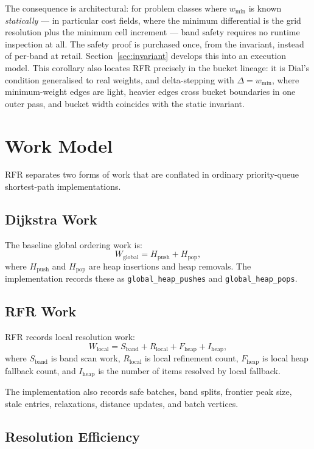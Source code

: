 \documentclass[11pt]{article}
\newcommand{\RFR}{\textsc{RFR}}
\begin{document}
The consequence is architectural: for problem classes where $w_{\min}$ is known \emph{statically} --- in particular cost fields, where the minimum differential is the grid resolution plus the minimum cell increment --- band safety requires no runtime inspection at all. The safety proof is purchased once, from the invariant, instead of per-band at retail. Section~\ref{sec:invariant} develops this into an execution model. This corollary also locates \RFR{} precisely in the bucket lineage: it is Dial's condition \cite{dial1969} generalised to real weights, and delta-stepping \cite{meyer2003} with $\Delta=w_{\min}$, where minimum-weight edges are light, heavier edges cross bucket boundaries in one outer pass, and bucket width coincides with the static invariant.

\section{Work Model}
\label{sec:work}

\RFR{} separates two forms of work that are conflated in ordinary priority-queue shortest-path implementations.

\subsection{Dijkstra Work}

The baseline global ordering work is:
\[
  W_{\text{global}} = H_{\text{push}} + H_{\text{pop}},
\]
where $H_{\text{push}}$ and $H_{\text{pop}}$ are heap insertions and heap removals. The implementation records these as \texttt{global\_heap\_pushes} and \texttt{global\_heap\_pops}.

\subsection{RFR Work}

\RFR{} records local resolution work:
\[
  W_{\text{local}} =
  S_{\text{band}} +
  R_{\text{local}} +
  F_{\text{heap}} +
  I_{\text{heap}},
\]
where $S_{\text{band}}$ is band scan work, $R_{\text{local}}$ is local refinement count, $F_{\text{heap}}$ is local heap fallback count, and $I_{\text{heap}}$ is the number of items resolved by local fallback.

The implementation also records safe batches, band splits, frontier peak size, stale entries, relaxations, distance updates, and batch vertices.

\subsection{Resolution Efficiency}
\end{document}
